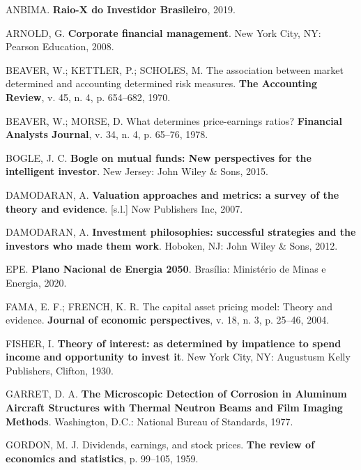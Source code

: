 \documentclass[aprovado,numbers]{coppe}
\newenvironment{cslreferences}%
  {}%
  {\par}
\begin{document}
  \hypertarget{refs}{}
  \begin{cslreferences}
  \leavevmode\hypertarget{ref-anbima2019}{}%
  ANBIMA. \textbf{Raio-X do Investidor Brasileiro}, 2019.

  \leavevmode\hypertarget{ref-arnold2008}{}%
  ARNOLD, G. \textbf{Corporate financial management}. New York City, NY: Pearson Education, 2008.

  \leavevmode\hypertarget{ref-beaver1970}{}%
  BEAVER, W.; KETTLER, P.; SCHOLES, M. The association between market determined and accounting determined risk measures. \textbf{The Accounting Review}, v. 45, n. 4, p. 654--682, 1970.

  \leavevmode\hypertarget{ref-beaver1978}{}%
  BEAVER, W.; MORSE, D. What determines price-earnings ratios? \textbf{Financial Analysts Journal}, v. 34, n. 4, p. 65--76, 1978.

  \leavevmode\hypertarget{ref-bogle2015}{}%
  BOGLE, J. C. \textbf{Bogle on mutual funds: New perspectives for the intelligent investor}. New Jersey: John Wiley \& Sons, 2015.

  \leavevmode\hypertarget{ref-damodaran2007}{}%
  DAMODARAN, A. \textbf{Valuation approaches and metrics: a survey of the theory and evidence}. {[}s.l.{]} Now Publishers Inc, 2007.

  \leavevmode\hypertarget{ref-damodaran2012}{}%
  DAMODARAN, A. \textbf{Investment philosophies: successful strategies and the investors who made them work}. Hoboken, NJ: John Wiley \& Sons, 2012.

  \leavevmode\hypertarget{ref-epe2020}{}%
  EPE. \textbf{Plano Nacional de Energia 2050}. Brasília: Ministério de Minas e Energia, 2020.

  \leavevmode\hypertarget{ref-fama2004}{}%
  FAMA, E. F.; FRENCH, K. R. The capital asset pricing model: Theory and evidence. \textbf{Journal of economic perspectives}, v. 18, n. 3, p. 25--46, 2004.

  \leavevmode\hypertarget{ref-fisher1930}{}%
  FISHER, I. \textbf{Theory of interest: as determined by impatience to spend income and opportunity to invest it}. New York City, NY: Augustusm Kelly Publishers, Clifton, 1930.

  \leavevmode\hypertarget{ref-techreport-exampleIn}{}%
  GARRET, D. A. \textbf{The Microscopic Detection of Corrosion in Aluminum Aircraft Structures with Thermal Neutron Beams and Film Imaging Methods}. Washington, D.C.: National Bureau of Standards, 1977.

  \leavevmode\hypertarget{ref-gordon1959}{}%
  GORDON, M. J. Dividends, earnings, and stock prices. \textbf{The review of economics and statistics}, p. 99--105, 1959.


\end{cslreferences}
\end{document}
